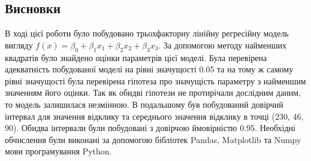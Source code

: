 \documentclass{article}
\begin{document}
    \subsection{Висновки}
      В ході цієї роботи було побудовано трьохфакторну лінійну регресійну модель вигляду 
      $f(x) = \beta_0 + \beta_1 x_1 + \beta_2 x_2 + \beta_3 x_3$. За допомогою методу найменших 
      квадратів було знайдено оцінки параметрів цієї моделі. Була перевірена 
      адекватність побудованої моделі на рівні значущості 0.05 та на тому ж самому 
      рівні значущості була перевірена гіпотеза про значущість параметру з 
      найменшим значенням його оцінки. Так як обидві гіпотези не протирічали 
      дослідним даним, то модель залишилася незмінною. В подальшому був побудований 
      довірчий інтервал для значення відклику та середнього значення відклику 
      в точці (230, 46, 90). Обидва інтервали були побудовані з довірчою ймовірністю 0.95.
      Необхідні обчислення були виконані за допомогою бібліотек Pandas, Matplotlib та 
      Numpy мови програмування Python. 
\end{document}
